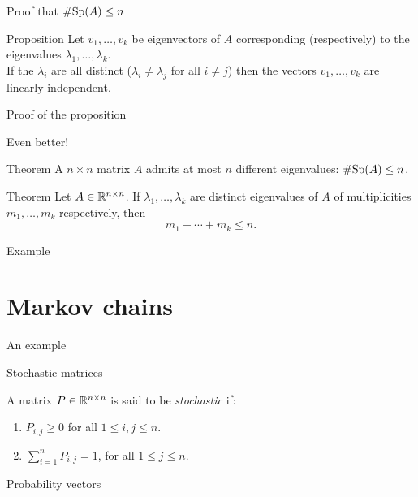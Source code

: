 \documentclass{beamer}
\begin{document}
\begin{frame}[t]{Proof that $\# {{\rm Sp}}(A) \leq n$}
	\grid

	\vspace{-0.4cm}
	\begin{block}{Proposition}
		Let $v_1, \dots, v_k$ be eigenvectors of $A$ corresponding (respectively) to the eigenvalues $\lambda_1, \dots, \lambda_k$.
		\\
		If the $\lambda_i$ are all distinct ($\lambda_i \neq \lambda_j$ for all $i \neq j$) then the vectors $v_1, \dots, v_k$ are linearly independent.
	\end{block}
\end{frame}

\begin{frame}[t]{Proof of the proposition}
	\grid

	\pause
\end{frame}

\begin{frame}[t]{Even better!}
	\grid

	\vspace{-0.4cm}
	\begin{block}{Theorem}
		A $n \times n$ matrix $A$ admits at most $n$ different eigenvalues: $\# {{\rm Sp}}(A) \leq n$.
	\end{block}
	\begin{block}{Theorem}
		Let $A \in \mathbb{R}^{n \times n}$. If $\lambda_1, \dots, \lambda_k$ are distinct eigenvalues of $A$ of multiplicities $m_1, \dots, m_k$ respectively, then
		$$
		m_1 + \cdots + m_k \leq n.
		$$
	\end{block}

\end{frame}

\begin{frame}[t]{Example}
	\grid

\end{frame}
\section{Markov chains}

\begin{frame}[t]{An example}
	\grid

\end{frame}

\begin{frame}[t]{Stochastic matrices}
	\grid

	\begin{definition}
		A matrix $P \in \mathbb{R}^{n \times n}$ is said to be \emph{stochastic} if:
		\begin{enumerate}
			\item $P_{i,j} \geq 0$ for all $1 \leq i,j \leq n$.
			\item $\sum\limits_{i=1}^n P_{i,j} = 1$, for all $1 \leq j \leq n$.
		\end{enumerate}
	\end{definition}
\end{frame}
\begin{frame}[t]{Probability vectors}
	\grid

\end{frame}
\end{document}
